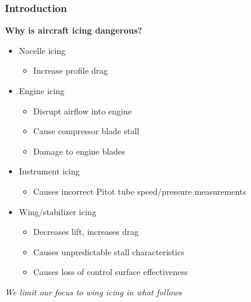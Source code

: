 \documentclass[9pt]{beamer}
\begin{document}
\begin{frame}
\frametitle{Introduction}
\label{sec-1-2}

\textbf{Why is aircraft icing dangerous?}
\begin{itemize}
\item Nacelle icing
\begin{itemize}
\item Increase profile drag
\end{itemize}
\item Engine icing
\begin{itemize}
\item Disrupt airflow into engine
\item Cause compressor blade stall
\item Damage to engine blades
\end{itemize}
\item Instrument icing
\begin{itemize}
\item Causes incorrect Pitot tube speed/pressure measurements
\end{itemize}
\item Wing/stabilizer icing
\begin{itemize}
\item Decreases lift, increases drag
\item Causes unpredictable stall characteristics
\item Causes loss of control surface effectiveness
\end{itemize}
\end{itemize}
\emph{We limit our focus to wing icing in what follows}
\end{frame}
\end{document}
